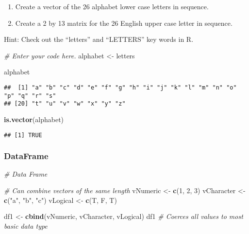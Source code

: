 \documentclass[
]{article}
\newenvironment{Shaded}{\begin{snugshade}}{\end{snugshade}}
\newcommand{\CommentTok}[1]{\textcolor[rgb]{0.56,0.35,0.01}{\textit{#1}}}
\newcommand{\DecValTok}[1]{\textcolor[rgb]{0.00,0.00,0.81}{#1}}
\newcommand{\FunctionTok}[1]{\textcolor[rgb]{0.13,0.29,0.53}{\textbf{#1}}}
\newcommand{\NormalTok}[1]{#1}
\newcommand{\OtherTok}[1]{\textcolor[rgb]{0.56,0.35,0.01}{#1}}
\newcommand{\StringTok}[1]{\textcolor[rgb]{0.31,0.60,0.02}{#1}}
\providecommand{\tightlist}{%
  \setlength{\itemsep}{0pt}\setlength{\parskip}{0pt}}
\begin{document}
\begin{enumerate}
\def\labelenumi{\arabic{enumi}.}
\tightlist
\item
  Create a vector of the 26 alphabet lower case letters in sequence.
\item
  Create a 2 by 13 matrix for the 26 English upper case letter in
  sequence.
\end{enumerate}

Hint: Check out the ``letters'' and ``LETTERS'' key words in R.

\begin{Shaded}
\begin{Highlighting}[]
\CommentTok{\# Enter your code here.}
\NormalTok{alphabet }\OtherTok{\textless{}{-}}\NormalTok{ letters}

\NormalTok{alphabet}
\end{Highlighting}
\end{Shaded}

\begin{verbatim}
##  [1] "a" "b" "c" "d" "e" "f" "g" "h" "i" "j" "k" "l" "m" "n" "o" "p" "q" "r" "s"
## [20] "t" "u" "v" "w" "x" "y" "z"
\end{verbatim}

\begin{Shaded}
\begin{Highlighting}[]
\FunctionTok{is.vector}\NormalTok{(alphabet)}
\end{Highlighting}
\end{Shaded}

\begin{verbatim}
## [1] TRUE
\end{verbatim}

\subsubsection{DataFrame}\label{dataframe}

\begin{Shaded}
\begin{Highlighting}[]
\CommentTok{\# Data Frame}

\CommentTok{\# Can combine vectors of the same length}
\NormalTok{vNumeric   }\OtherTok{\textless{}{-}} \FunctionTok{c}\NormalTok{(}\DecValTok{1}\NormalTok{, }\DecValTok{2}\NormalTok{, }\DecValTok{3}\NormalTok{)}
\NormalTok{vCharacter }\OtherTok{\textless{}{-}} \FunctionTok{c}\NormalTok{(}\StringTok{"a"}\NormalTok{, }\StringTok{"b"}\NormalTok{, }\StringTok{"c"}\NormalTok{)}
\NormalTok{vLogical   }\OtherTok{\textless{}{-}} \FunctionTok{c}\NormalTok{(T, F, T)}

\NormalTok{df1 }\OtherTok{\textless{}{-}} \FunctionTok{cbind}\NormalTok{(vNumeric, vCharacter, vLogical)}
\NormalTok{df1  }\CommentTok{\# Coerces all values to most basic data type}
\end{Highlighting}
\end{Shaded}
\end{document}
